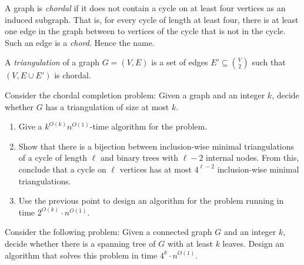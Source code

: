 \begin{exercise}[\hard]
A graph is \emph{chordal} if it does not contain a cycle on at least four vertices as an induced subgraph.
That is, for every cycle of length at least four, 
there is at least one edge in the graph between to vertices of the cycle that is not in the cycle. 
Such an edge is a \emph{chord}. Hence the name.

A \emph{triangulation} of a graph $G=(V,E)$ is a set of edges $E' \subseteq \binom{V}{2}$ such that $(V,E\cup E')$ is chordal.

Consider the chordal completion problem: Given a graph and an integer $k$, decide whether $G$ has a triangulation of size at most $k$. 
\begin{enumerate}
\item Give a $k^{O(k)} n^{O(1)}$-time algorithm for the problem.
\item Show that there is a bijection between inclusion-wise minimal triangulations of a cycle of length $\ell$ and binary trees with $\ell-2$ internal nodes. From this, conclude that a cycle on $\ell$ vertices has at most $4^{\ell-2}$ inclusion-wise minimal triangulations.
\item Use the previous point to design an algorithm for the problem running in time $2^{O(k)} \cdot n^{O(1)}$.
\end{enumerate}
\end{exercise}

\begin{exercise}[\hard]
Consider the following problem: Given a connected graph $G$ and an integer $k$, decide whether there is a spanning tree of $G$ with at least $k$ leaves. Design an algorithm that solves this problem in time $4^k \cdot n^{O(1)}$.
\end{exercise}
